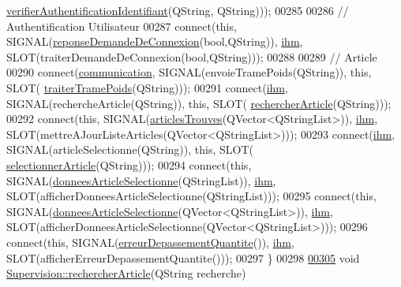 \begin{DoxyCode}
{      \hyperlink{class_supervision_ac596674d302f1f747d65c8334aa1ced9}{verifierAuthentificationIdentifiant}(QString, QString)));
00285 
00286     \textcolor{comment}{// Authentification Utilisateur}
00287     connect(\textcolor{keyword}{this}, SIGNAL(\hyperlink{class_supervision_a116ed6de0e9e3c9c94886235e9f6d6e8}{reponseDemandeDeConnexion}(\textcolor{keywordtype}{bool},QString)), 
      \hyperlink{class_supervision_a5aa823c55bf1531497bbb8fdbc6c5528}{ihm}, SLOT(traiterDemandeDeConnexion(\textcolor{keywordtype}{bool},QString)));
00288 
00289     \textcolor{comment}{// Article}
00290     connect(\hyperlink{class_supervision_a045be64d74de4f7688574eec108220a5}{communication}, SIGNAL(envoieTramePoids(QString)), \textcolor{keyword}{this}, SLOT(
      \hyperlink{class_supervision_ae72bdcb7d70bbb8e13cf61be95ee7c06}{traiterTramePoids}(QString)));
00291     connect(\hyperlink{class_supervision_a5aa823c55bf1531497bbb8fdbc6c5528}{ihm}, SIGNAL(rechercheArticle(QString)), \textcolor{keyword}{this}, SLOT(
      \hyperlink{class_supervision_af2df200be6727338110b81812703d0ae}{rechercherArticle}(QString)));
00292     connect(\textcolor{keyword}{this}, SIGNAL(\hyperlink{class_supervision_a3023468d106abfe7dc697e61a63778ed}{articlesTrouves}(QVector<QStringList>)), 
      \hyperlink{class_supervision_a5aa823c55bf1531497bbb8fdbc6c5528}{ihm}, SLOT(mettreAJourListeArticles(QVector<QStringList>)));
00293     connect(\hyperlink{class_supervision_a5aa823c55bf1531497bbb8fdbc6c5528}{ihm}, SIGNAL(articleSelectionne(QString)), \textcolor{keyword}{this}, SLOT(
      \hyperlink{class_supervision_a2efb7e4dabe2664c9cfd41d703b6250c}{selectionnerArticle}(QString)));
00294     connect(\textcolor{keyword}{this}, SIGNAL(\hyperlink{class_supervision_ae486eafc331964e223c35ae2b54fa669}{donneesArticleSelectionne}(QStringList)), 
      \hyperlink{class_supervision_a5aa823c55bf1531497bbb8fdbc6c5528}{ihm}, SLOT(afficherDonneesArticleSelectionne(QStringList)));
00295     connect(\textcolor{keyword}{this}, SIGNAL(\hyperlink{class_supervision_ae486eafc331964e223c35ae2b54fa669}{donneesArticleSelectionne}(QVector<QStringList>)), 
      \hyperlink{class_supervision_a5aa823c55bf1531497bbb8fdbc6c5528}{ihm}, SLOT(afficherDonneesArticleSelectionne(QVector<QStringList>)));
00296     connect(\textcolor{keyword}{this}, SIGNAL(\hyperlink{class_supervision_a3fb19a3c16324a21af956fd272ca469d}{erreurDepassementQuantite}()), 
      \hyperlink{class_supervision_a5aa823c55bf1531497bbb8fdbc6c5528}{ihm}, SLOT(afficherErreurDepassementQuantite()));
00297 \}
00298 
\hyperlink{class_supervision_af2df200be6727338110b81812703d0ae}{00305} \textcolor{keywordtype}{void} \hyperlink{class_supervision_af2df200be6727338110b81812703d0ae}{Supervision::rechercherArticle}(QString recherche)
}
\end{DoxyCode}
